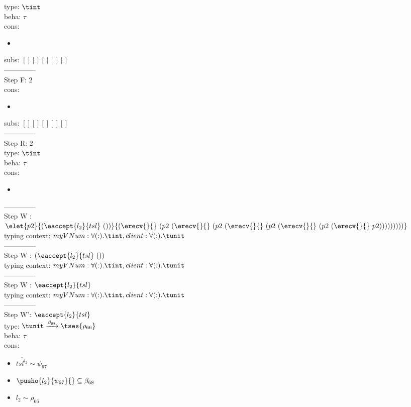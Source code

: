 \documentclass[12pt]{article}
\begin{document}
  type: $ \tint $ 
\\  beha: $ \tau $ 
\\  cons: \begin{itemize}
\item $  $
\end{itemize} 
  subs:  $ [ ] [] [] [] [] $  
 \\--------------\\ 
Step F: $ 2 $
 \\ cons: \begin{itemize}
\item $  $
\end{itemize}
 subs:  $ [ ] [] [] [] [] $ 
  \\--------------\\ 
Step R: $ 2 $\\
  type: $ \tint $ 
\\  beha: $ \tau $ 
\\  cons: \begin{itemize}
\item $  $
\end{itemize} 
  --------------\\ 
Step W : $ \elet{p2}{(\eaccept{ l_{2} }{tsl}~())}{(\erecv{}{}~(p2~(\erecv{}{}~(p2~(\erecv{}{}~(p2~(\erecv{}{}~(p2~(\erecv{}{}~p2)))))))))} $\\
 typing context: $ myVNum:\forall ( : ). \tint, client:\forall ( : ). \tunit$ 
\\ --------------\\
Step W : $ (\eaccept{ l_{2} }{tsl}~()) $\\
 typing context: $ myVNum:\forall ( : ). \tint, client:\forall ( : ). \tunit$ 
\\ --------------\\
Step W : $ \eaccept{ l_{2} }{tsl} $\\
 typing context: $ myVNum:\forall ( : ). \tint, client:\forall ( : ). \tunit$ 
\\ --------------\\
Step W': $ \eaccept{ l_{2} }{tsl} $\\
  type: $ \tunit \xrightarrow{\beta_{68}}  \tses{ \rho_{66}} $ 
\\  beha: $ \tau $ 
\\  cons: \begin{itemize}
\item $ \overline{{tsl}^{l_{2}}} \sim\psi_{67} $
\item $ \pusho{ l_{2}} {\psi_{67}}{} \subseteq \beta_{68} $
\item $ l_{2} \sim\rho_{66} $
\end{itemize} 
\end{document}
